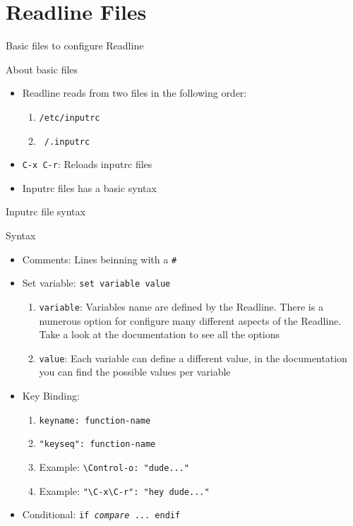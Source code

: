 \documentclass[10pt, compress, aspectratio=169]{beamer}
\begin{document}
\section{Readline Files}

\begin{frame}{Basic files to configure Readline}
  \begin{exampleblock}{About basic files}
    \begin{itemize}
      \item Readline reads from two files in the following order:
        \begin{enumerate}
          \item \texttt{/etc/inputrc}
          \item \texttt{~/.inputrc}
        \end{enumerate}
      \item \texttt{C-x C-r}: Reloads inputrc files
      \item Inputrc files has a basic syntax
    \end{itemize}
  \end{exampleblock}
\end{frame}

\begin{frame}{Inputrc file syntax}
  \begin{exampleblock}{Syntax}
    \begin{itemize}
      \item Comments: Lines beinning with a \texttt{\#}
      \item Set variable: \texttt{set variable value}
      \begin{enumerate}
        \item \texttt{variable}: Variables name are defined by the Readline.
              There is a numerous option for configure many different aspects
              of the Readline. Take a look at the documentation to see all the
              options
        \item \texttt{value}: Each variable can define a different value,
              in the documentation you can find the possible values per variable
      \end{enumerate}
      \item Key Binding:
        \begin{enumerate}
          \item \texttt{keyname: function-name}
          \item \texttt{"keyseq": function-name}
          \item Example: \texttt{\textbackslash{Control}-o: "dude..."}
          \item Example: \texttt{"\textbackslash{C}-x\textbackslash{C}-r": "hey dude..."}
        \end{enumerate}
      \item Conditional: \texttt{\textdollar{}if
            \textit{compare} ... \textdollar{}endif}
    \end{itemize}
  \end{exampleblock}
\end{frame}
\end{document}
